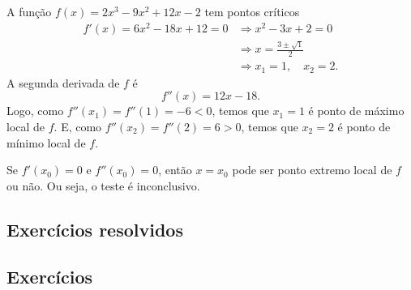 \begin{ex}
  A função $f(x) = 2x^3 - 9x^2 + 12x - 2$ tem pontos críticos
  \begin{align}
    f'(x) = 6x^2 - 18x + 12 = 0 &\Rightarrow x^2 - 3x + 2 = 0 \\
                                &\Rightarrow x = \frac{3 \pm \sqrt{1}}{2}\\
                                &\Rightarrow x_1 = 1,\quad x_2 = 2.
  \end{align}
  A segunda derivada de $f$ é
  \begin{equation}
    f''(x) = 12x - 18.
  \end{equation}
  Logo, como $f''(x_1) = f''(1) = -6 < 0$, temos que $x_1 = 1$ é ponto de máximo local de $f$. E, como $f''(x_2) = f''(2) = 6 > 0$, temos que $x_2 = 2$ é ponto de mínimo local de $f$.
\end{ex}

\begin{obs}
  Se $f'(x_0) = 0$ e $f''(x_0) = 0$, então $x=x_0$ pode ser ponto extremo local de $f$ ou não. Ou seja, o teste é inconclusivo.
\end{obs}

\emconstrucao

\subsection*{Exercícios resolvidos}

\emconstrucao

\subsection*{Exercícios}

\emconstrucao